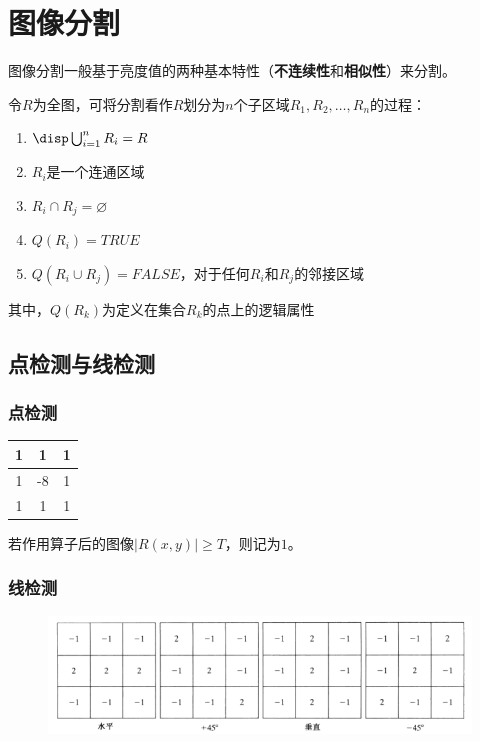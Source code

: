 
\section{图像分割}
图像分割一般基于亮度值的两种基本特性（\textbf{不连续性}和\textbf{相似性}）来分割。

\begin{definition}[分割]
令$R$为全图，可将分割看作$R$划分为$n$个子区域$R_1,R_2,\ldots,R_n$的过程：
\begin{enumerate}
	\item $\disp\bigcup_{i=1}^n R_i=R$
	\item $R_i$是一个连通区域
	\item $R_i\cap R_j=\varnothing$
	\item $Q(R_i)=TRUE$
	\item $Q(R_i\cup R_j)=FALSE$，对于任何$R_i$和$R_j$的邻接区域
\end{enumerate}
其中，$Q(R_k)$为定义在集合$R_k$的点上的逻辑属性
\end{definition}

\subsection{点检测与线检测}
\subsubsection{点检测}
\begin{center}
\begin{tabular}{|c|c|c|}\hline
1 & 1 & 1\\\hline
1 & -8 & 1\\\hline
1 & 1 & 1\\\hline
\end{tabular}
\end{center}
若作用算子后的图像$|R(x,y)|\geq T$，则记为$1$。

\subsubsection{线检测}
\begin{figure}[H]
\centering
\includegraphics[width=0.9\linewidth]{fig/line_detect.png}
\end{figure}

